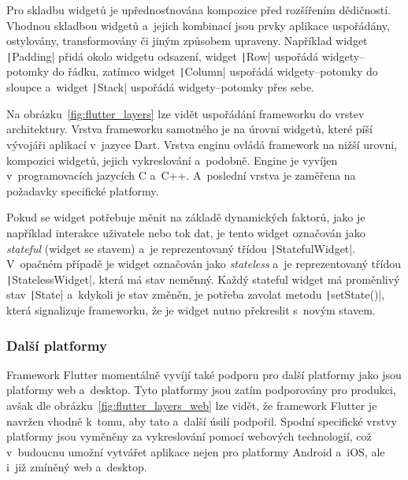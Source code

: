 Pro skladbu widgetů je upřednosťnována kompozice před rozšířením dědičností.
Vhodnou skladbou widgetů a~jejich kombinací jsou prvky aplikace uspořádány,
ostylovány, transformovány či jiným způsobem upraveny.
Například widget \texttt|Padding| přidá okolo widgetu odsazení,
widget \texttt|Row| uspořádá widgety--potomky do řádku,
zatímco widget \texttt|Column| uspořádá widgety--potomky
do sloupce a~widget \texttt|Stack| uspořádá widgety--potomky
přes sebe.~\cite{flutter_technical_overview}

\pagebreak
Na obrázku~\ref{fig:flutter_layers} lze vidět uspořádání frameworku do vrstev
architektury.
Vrstva frameworku samotného je na úrovni widgetů,
které píší vývojáři aplikací v~jazyce Dart.
Vrstva enginu ovládá framework na nižší urovni, kompozici widgetů,
jejich vykreslování a~podobně.
Engine je vyvíjen v~programovacích jazycích C a~C++.
A~poslední vrstva je zaměřena na požadavky specifické
platformy.~\cite{flutter_technical_overview}

Pokud se widget potřebuje měnit na základě dynamických faktorů,
jako je například interakce uživatele nebo tok dat,
je tento widget označován jako \emph{stateful} (widget se stavem) a~je
reprezentovaný třídou \texttt|StatefulWidget|.
V~opačném případě je widget označován jako \emph{stateless} a~je 
reprezentovaný třídou \texttt|StatelessWidget|,
která má stav neměnný.
Každý stateful widget má proměnlivý stav \texttt|State|
a~kdykoli je stav změněn,
je potřeba zavolat metodu \texttt|setState()|,
která signalizuje frameworku,
že je widget nutno překreslit s~novým stavem.~\cite{flutter_technical_overview}

\subsubsection*{Další platformy}

Framework Flutter momentálně vyvíjí také podporu pro
další platformy jako jsou platformy web a~desktop.
Tyto platformy jsou zatím podporovány pro produkci,
avšak dle obrázku~\ref{fig:flutter_layers_web} lze vidět,
že framework Flutter je navržen vhodně k~tomu,
aby tato a~další úsilí podpořil.
Spodní specifické vrstvy platformy jsou vyměněny za vykreslování pomocí
webových technologií,
což v~budoucnu umožní vytvářet aplikace nejen pro platformy Android a~iOS,
ale i~již zmíněný web a~desktop.~\cite{flutter_web, flutter_desktop} 

